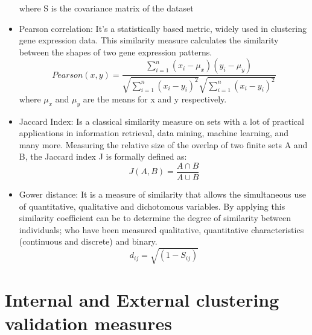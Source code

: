 \begin{itemize}
    where S is the covariance matrix of the dataset
    \item Pearson correlation: It's a statistically based metric, widely used in clustering gene expression data. This similarity
measure calculates the similarity between the shapes of two gene expression patterns.
    \begin{equation}
        Pearson(x,y)= \frac{\sum_{i=1}^n(x_i-\mu_x)(y_i-\mu_y)}{\sqrt{\sum_{i=1}^n(x_i-y_i)^2}\sqrt{\sum_{i=1}^n(x_i-y_i)^2}}
    \end{equation}
    where $\mu_x$ and $\mu_y$ are the means for x and y respectively.
    \item Jaccard Index: \cite{b35} Is a classical similarity measure on sets with a lot of practical applications in information retrieval, data mining, machine learning, and many more. Measuring the relative size of the overlap of two finite sets A and B, the Jaccard index J is formally defined as:
    \begin{equation}
        J(A,B) = \frac{A \cap B}{A \cup B}
    \end{equation}
    \item Gower distance: It is a measure of similarity that allows the simultaneous use of quantitative, qualitative and dichotomous variables. By applying this similarity coefficient can be to determine the degree of similarity between individuals; who have been measured qualitative, quantitative characteristics (continuous and discrete) and binary.
    \begin{equation}
        d_{ij}=\sqrt{(1-S_{ij})}
    \end{equation}

\end{itemize}

\section*{Internal and External clustering validation measures}\label{sec:internalandexternalmetricssec}

